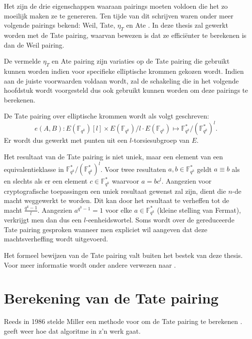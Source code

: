 Het zijn de drie eigenschappen waaraan pairings moeten voldoen die het zo moeilijk maken ze te genereren. Ten tijde van dit schrijven waren onder meer volgende pairings bekend: Weil, Tate, $\eta_T$ \cite{eta} en Ate \cite{ate}. In deze thesis zal gewerkt worden met de Tate pairing, waarvan bewezen is dat ze effici\"enter te berekenen is dan de Weil pairing.

De vermelde $\eta_T$ en Ate pairing zijn variaties op de Tate pairing die gebruikt kunnen worden indien voor specifieke elliptische krommen gekozen wordt. Indien aan de juiste voorwaarden voldaan wordt, zal de schakeling die in het volgende hoofdstuk wordt voorgesteld dus ook gebruikt kunnen worden om deze pairings te berekenen.

De Tate pairing over elliptische krommen wordt als volgt geschreven:
\[e(A, B): E(\mathbb{F}_{q^k})[l] \times E(\mathbb{F}_{q^k})/l \cdot E(\mathbb{F}_{q^k}) \mapsto \mathbb{F}_{q^k}^* / (\mathbb{F}_{q^k}^*)^l.\]
Er wordt dus gewerkt met punten uit een $l$-torsiesubgroep van $E$.

Het resultaat van de Tate pairing is niet uniek, maar een element van een equivalentieklasse in $\mathbb{F}_{q^k}^* / (\mathbb{F}_{q^k}^*)^l$. Voor twee resultaten $a, b \in \mathbb{F}_{q^k}^*$ geldt $a \equiv b$ als en slechts als er een element $c \in \mathbb{F}_{q^k}^*$ waarvoor $a = bc^l$. Aangezien voor cryptografische toepassingen een uniek resultaat gewenst zal zijn, dient die $n$-de macht weggewerkt te worden. Dit kan door het resultaat te verheffen tot de macht $\frac{q^k - 1 }{l}$. Aangezien $a^{q^k - 1} = 1$ voor elke $a \in \mathbb{F}_{q^k}^*$ (kleine stelling van Fermat), verkrijgt men dan dus een $l$-eenheidswortel. Soms wordt over de gereduceerde Tate pairing gesproken wanneer men expliciet wil aangeven dat deze machtsverheffing wordt uitgevoerd.

Het formeel bewijzen van de Tate pairing valt buiten het bestek van deze thesis. Voor meer informatie wordt onder andere verwezen naar \cite{maas, ruck, hess}.

\section{Berekening van de Tate pairing\label{sectie-pairings-berekening}}

Reeds in 1986 stelde Miller een methode voor om de Tate pairing te berekenen \cite{miller, barreto-efficient}.  geeft weer hoe dat algoritme in z'n werk gaat.

